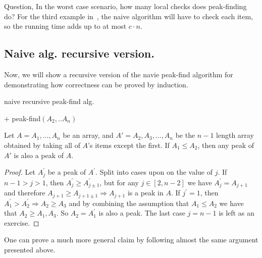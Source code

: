Question, In the worst case scenario, how many local checks does peak-finding do? For the third example in~, the naive algorithm will have to check each item, so the running time adds up to at most $c \cdot n$.

\subsection{Naive alg. recursive version.}
Now, we will show a recursive version of the navie peak-find algorithm for demonstrating how correctness can be proved by induction. 
\begin{algorithm}
\caption{naive recursive peak-find alg.}
  + peak-find$(A_{2}, .. A_{n})$
 \end{algorithm}

 \begin{claim} \label{claim:subarray} 
Let $A = A_1, \dots, A_n$ be an array, and $A' = A_2, A_3, \dots, A_n$ be the $n-1$ length array obtained by taking all of $A$'s items except the first. If $A_1 \le A_2$, then any peak of $A'$ is also a peak of $A$.
\end{claim}
\begin{proof} 
Let $A^{\prime}_{j}$ be a peak of $A^{\prime}$. Split into cases upon on the value of $j$. If $n-1 > j > 1$, then $A^{\prime}_{j} \ge A^{\prime}_{j \pm 1}$, but for any $j \in [2, n-2]$ we have $A^{\prime}_{j} = A_{j+1}$ and therefore $A_{j+1} \ge A_{j+1 \pm 1} \Rightarrow A_{j+1}$ is a peak in $A$. If $j^{\prime} = 1$, then $A^{\prime}_{1} > A^{\prime}_{2} \Rightarrow A_{2} \ge A_{3}$ and by combining the assumption that $A_{1} \le A_{2}$ we have that $A_{2} \ge A_{1}, A_{3}$. So $A_{2} = A^{\prime}_{1}$ is also a peak. The last case $j = n-1$ is left as an exercise.
\end{proof}

One can prove a much more general claim by following almost the same argument presented above.

